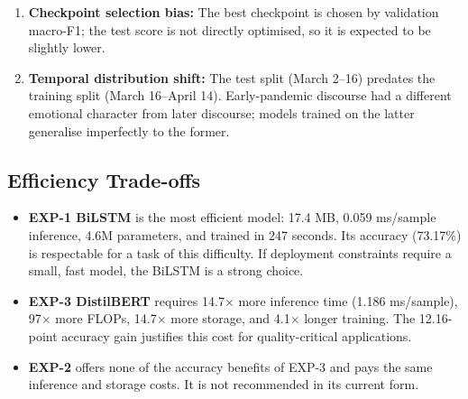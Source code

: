 \begin{enumerate}
    \item \textbf{Checkpoint selection bias:} The best checkpoint is chosen by validation macro-F1; the test score is not directly optimised, so it is expected to be slightly lower.
    \item \textbf{Temporal distribution shift:} The test split (March 2--16) predates the training split (March 16--April 14). Early-pandemic discourse had a different emotional character from later discourse; models trained on the latter generalise imperfectly to the former.
\end{enumerate}

\subsection{Efficiency Trade-offs}

\begin{itemize}
    \item \textbf{EXP-1 BiLSTM} is the most efficient model: 17.4 MB, 0.059 ms/sample inference, 4.6M parameters, and trained in 247 seconds. Its accuracy (73.17\%) is respectable for a task of this difficulty. If deployment constraints require a small, fast model, the BiLSTM is a strong choice.
    \item \textbf{EXP-3 DistilBERT} requires 14.7$\times$ more inference time (1.186 ms/sample), 97$\times$ more FLOPs, 14.7$\times$ more storage, and 4.1$\times$ longer training. The 12.16-point accuracy gain justifies this cost for quality-critical applications.
    \item \textbf{EXP-2} offers none of the accuracy benefits of EXP-3 and pays the same inference and storage costs. It is not recommended in its current form.
\end{itemize}
